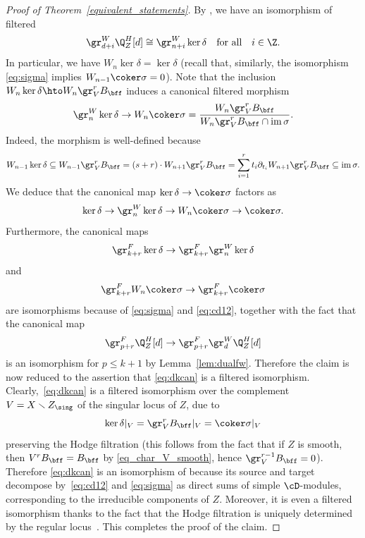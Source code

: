 \begin{proof}[Proof of Theorem~\ref{equivalent_statements}]
By \cite[Th.\,1.2]{CD}, we have an isomorphism of filtered \DXmodules
\begin{equation}\label{eq:cd12}
\gr^W_{d+i}\Q_Z^H[d] \cong \gr^W_{n+i}\ker\delta \quad\text{for all}\quad i\in\Z.
\end{equation}
In particular, we have $W_n\ker\delta=\ker\delta$ (recall that, similarly, the isomorphism \eqref{eq:sigma}
implies $W_{n-1}\coker\sigma=0$).
Note that the inclusion $W_n\ker\delta \hto W_n\gr^r_V B_\bff$ induces a canonical filtered morphism
\begin{equation}\label{eq:dkcan}
\gr^W_n\ker\delta \to W_n\coker\sigma=\frac{W_n\gr^r_V B_\bff}{W_n\gr^r_V B_\bff\cap \mathrm{im\,}\sigma}.
\end{equation}
Indeed, the morphism is well-defined because
\[
W_{n-1}\ker\delta \subseteq W_{n-1}\gr^r_VB_\bff=(s+r)\cdot W_{n+1}\gr^r_VB_\bff=\sum^r_{i=1} t_i\partial_{t_i}W_{n+1}\gr^r_VB_\bff \subseteq \mathrm{im\,}\sigma.
\]
We deduce that the canonical map $\ker \delta \to \coker \sigma$ factors as
\[
\ker\delta \to \gr^W_n\ker\delta \to W_n\coker\sigma \to \coker\sigma.
\]
Furthermore, the canonical maps
\[\gr^F_{k+r}\ker\delta \to \gr^F_{k+r}\gr^W_n\ker\delta\] and
\[\gr^F_{k+r}W_n\coker\sigma \to \gr^F_{k+r}\coker\sigma\] are isomorphisms because of \eqref{eq:sigma} and \eqref{eq:cd12}, together with the fact that
the canonical map
\[
\gr^F_{p+r}\Q_Z^H[d] \to\gr^F_{p+r}\gr^W_d\Q_Z^H[d]
\]
is an isomorphism for $p\leq k+1$ by Lemma~\ref{lem:dualfw}. Therefore the claim is now reduced to the
assertion that \eqref{eq:dkcan} is a filtered isomorphism. Clearly,~\eqref{eq:dkcan} is a filtered isomorphism over the complement
$V=X\smallsetminus Z_\sing$ of the singular locus of $Z$, due to
\[
\ker\delta\vert_V =\gr^r_V B_\bff\vert_V = \coker\sigma\vert_V
\]
preserving the Hodge filtration (this follows from the fact that if $Z$ is smooth, then $V^rB_{\bff}=B_{\bff}$ by \eqref{eq_char_V_smooth}, hence $\gr_V^{r-1}B_{\bff}=0$).
Therefore \eqref{eq:dkcan} is an isomorphism of \DXmodules because its source and target decompose by~\eqref{eq:cd12} and \eqref{eq:sigma}
as direct sums of simple $\cD$-modules, corresponding to the irreducible components of $Z$. Moreover, it is even a filtered isomorphism thanks to the fact that the Hodge filtration is uniquely determined by the regular locus~\cite[(3.2.2.2)]{Saito_MHP}. This completes the proof of the claim.


\end{proof}
